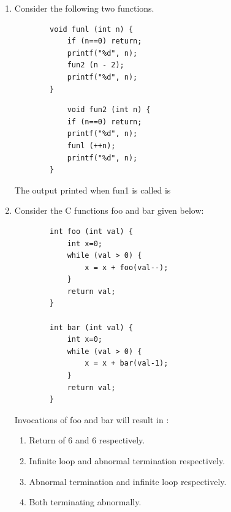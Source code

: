 \documentclass[a4paper, 11pt]{article}
\begin{document}
\begin{enumerate}
    \hfill{}

    \item Consider the following two functions.\\
    \begin{minipage}{5cm}
    \begin{lstlisting}
        void funl (int n) {
            if (n==0) return;
            printf("%d", n);
            fun2 (n - 2);
            printf("%d", n);
        }
    \end{lstlisting}
    
    \end{minipage}
    \begin{minipage}{5cm}
    \begin{lstlisting}
            void fun2 (int n) {
            if (n==0) return;
            printf("%d", n);
            funl (++n);
            printf("%d", n);
        }
    \end{lstlisting}
    
    \end{minipage}
        
    
    The output printed when fun1 is called is
    \begin{enumerate}
    \end{enumerate}
    
    \hfill{}

    \item Consider the C functions foo and bar given below:
    \begin{verbatim}
        int foo (int val) {
            int x=0;
            while (val > 0) {
                x = x + foo(val--);
            }
            return val;
        }

        int bar (int val) {
            int x=0;
            while (val > 0) {
                x = x + bar(val-1);
            }
            return val;
        }
    \end{verbatim}
    Invocations of foo and bar will result in :
    \begin{enumerate}
        \item Return of $6$ and $6$ respectively.
        \item Infinite loop and abnormal termination respectively.
        \item Abnormal termination and infinite loop respectively.
        \item Both terminating abnormally.
    \end{enumerate}
    

\end{enumerate}
\end{document}
